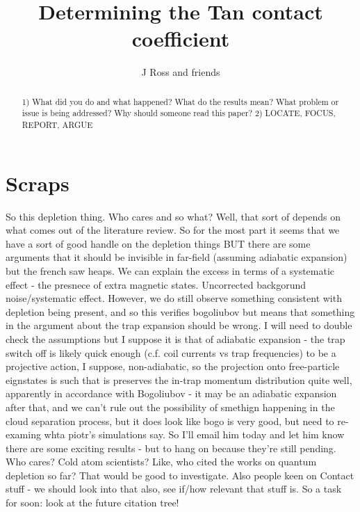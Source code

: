 \documentclass[%
 reprint,
 amsmath,amssymb,
 aps,
]{revtex4-1}
\begin{document}
\title{Determining the Tan contact coefficient}%

\author{J Ross and friends}



\begin{abstract}

1)
What did you do and what happened?
What do the results mean?
What problem or issue is being addressed?
Why should someone read this paper?
2)
LOCATE, FOCUS, REPORT, ARGUE
\end{abstract}

\maketitle

\section{Scraps}
So this depletion thing. Who cares and so what? Well, that sort of depends on what comes out of the literature review. So for the most part it seems that we have a sort of good handle on the depletion things BUT there are some arguments that it should be invisible in far-field (assuming adiabatic expansion) but the french saw heaps. We can explain the excess in terms of a systematic effect - the presnece of extra magnetic states. Uncorrected backgorund noise/systematic effect. However, we do still observe something consistent with depletion being present, and so this verifies bogoliubov but means that something in the argument about the trap expansion should be wrong. I will need to double check the assumptions but I suppose it is that of adiabatic expansion - the trap switch off is likely quick enough (c.f. coil currents vs trap frequencies) to be a projective action, I suppose, non-adiabatic, so the projection onto free-particle eignstates is such that is preserves the in-trap momentum distribution quite well, apparently in accordance with Bogoliubov - it may be an adiabatic expansion after that, and we can't rule out the possibility of smethign happening in the cloud separation process, but it does look like bogo is very good, but need to re-examing whta piotr's simulations say. So I'll email him today and let him know there are some exciting results - but to hang on because they're still pending. Who cares? Cold atom scientists? Like, who cited the works on quantum depletion so far? That would be good to investigate. Also people keen on Contact stuff - we should look into that also, see if/how relevant that stuff is. So a task for soon: look at the future citation tree!
\end{document}
